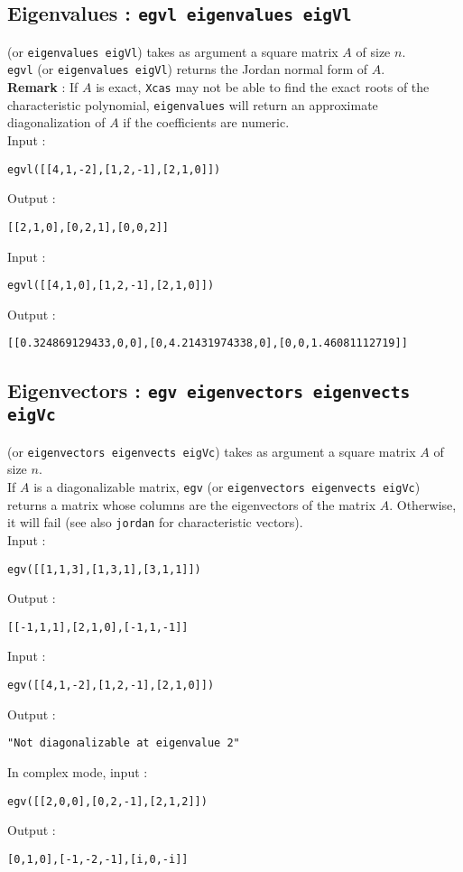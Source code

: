\documentclass[a4paper,11pt]{book}
\begin{document}
\subsection{Eigenvalues : {\tt egvl eigenvalues eigVl}}
 (or {\tt eigenvalues eigVl}) takes as argument a 
square matrix $A$ of size $n$.\\
{\tt egvl} (or {\tt eigenvalues eigVl}) returns the Jordan normal
form of $A$.\\
{\bf Remark} : If $A$ is exact, {\tt Xcas} may not be able
to find the exact roots of the characteristic polynomial, 
{\tt eigenvalues} will return an approximate diagonalization of $A$ if the
coefficients are numeric.\\
Input :
\begin{center}{\tt egvl([[4,1,-2],[1,2,-1],[2,1,0]])}\end{center}
Output :
\begin{center}{\tt [[2,1,0],[0,2,1],[0,0,2]] }\end{center}
Input :
\begin{center}{\tt egvl([[4,1,0],[1,2,-1],[2,1,0]])}\end{center}
Output :
\begin{center}{\tt [[0.324869129433,0,0],[0,4.21431974338,0],[0,0,1.46081112719]]}\end{center}

\subsection{Eigenvectors : {\tt egv eigenvectors eigenvects \\
eigVc}}
 (or {\tt eigenvectors eigenvects eigVc}) takes as argument 
a square matrix $A$ of size $n$.\\
If $A$ is a diagonalizable matrix, {\tt egv} (or 
{\tt eigenvectors eigenvects eigVc}) returns a matrix whose columns are the 
eigenvectors of the matrix $A$. Otherwise, it will fail (see also
{\tt jordan} for characteristic vectors).\\ 
Input :
\begin{center}{\tt egv([[1,1,3],[1,3,1],[3,1,1]])}\end{center}
Output :
\begin{center}{\tt [[-1,1,1],[2,1,0],[-1,1,-1]] }\end{center}
Input :
\begin{center}{\tt egv([[4,1,-2],[1,2,-1],[2,1,0]])}\end{center}
Output :
\begin{center}{\tt "Not diagonalizable at eigenvalue 2"}\end{center}
In complex mode, input :
\begin{center}{\tt egv([[2,0,0],[0,2,-1],[2,1,2]])}\end{center}
Output :
\begin{center}{\tt [0,1,0],[-1,-2,-1],[i,0,-i]]}\end{center}
\end{document}
